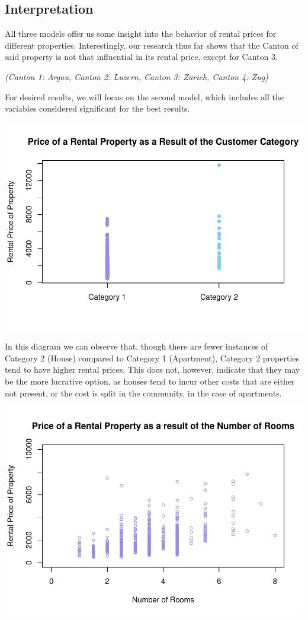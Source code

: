 \documentclass[
]{article}
\begin{document}
\subsection{Interpretation}\label{interpretation}

All three models offer us some insight into the behavior of rental
prices for different properties. Interestingly, our research thus far
shows that the Canton of said property is not that influential in its
rental price, except for Canton 3.

\emph{(Canton 1: Argau, Canton 2: Luzern, Canton 3: Zürich, Canton 4:
Zug)}

For desired results, we will focus on the second model, which includes
all the variables considered significant for the best results.

\includegraphics{2024_groupXX_report_files/figure-latex/LM Price Vs Category-1.pdf}

In this diagram we can observe that, though there are fewer instances of
Category 2 (House) compared to Category 1 (Apartment), Category 2
properties tend to have higher rental prices. This does not, however,
indicate that they may be the more lucrative option, as houses tend to
incur other costs that are either not present, or the cost is split in
the community, in the case of apartments.

\includegraphics{2024_groupXX_report_files/figure-latex/LM First Model Plot-1.pdf}
\end{document}
